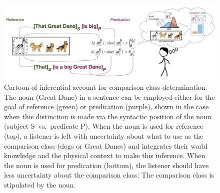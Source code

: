\documentclass[10pt,letterpaper]{article}
\begin{document}


\begin{figure}[t]
\begin{center}
\includegraphics[width=0.9\linewidth]{ref-pred-cartoon-w-subscripts2.pdf}
\end{center}
\caption{Cartoon of inferential account for comparison class determination. The noun (Great Dane) in a sentence can be employed either for the goal of reference (green) or predication (purple), shown in the case when this distinction is made via the syntactic position of the noun (subject S~vs.~predicate P). When the noun is used for reference (top), a listener is left with uncertainty about what to use as the comparison class (dogs or Great Danes) and integrates their world knowledge and the physical context to make this inference.  When the noun is used for predication (bottom), the listener should have less uncertainty about the comparison class: The comparison class is stipulated by the noun.}
\label{model-cartoon}
\end{figure}
\end{document}
